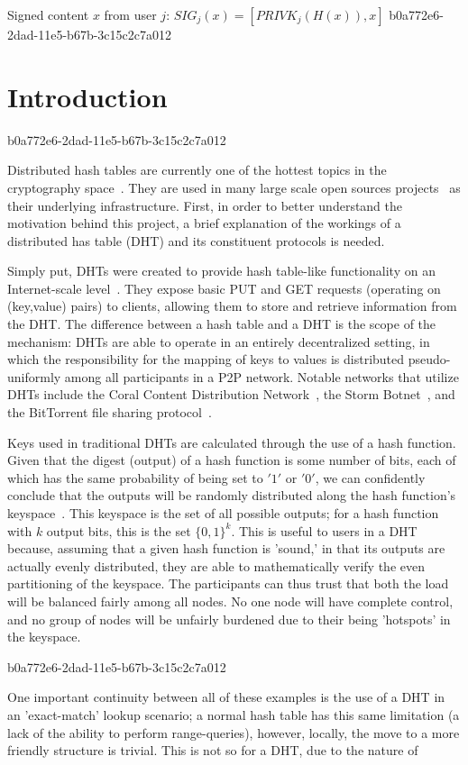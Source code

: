 \documentclass[12pt]{article}
\begin{document}
Signed content $x$ from user $j$: $SIG_j(x) = \left[ PRIVK_j( H(x) ), x \right]$
b0a772e6-2dad-11e5-b67b-3c15c2c7a012
\section{Introduction}
b0a772e6-2dad-11e5-b67b-3c15c2c7a012\par Distributed hash tables are currently one of the hottest topics in the cryptography space~\cite{Stoica:2001dj,Rowstron:2001ea,Ratnasamy:2001wn}. They are used in many large scale open sources projects~\cite{Freitas:2013tb,Xu:2010vs,Perfitt:2010fh} as their underlying infrastructure. First, in order to better understand the motivation behind this project, a brief explanation of the workings of a distributed has table (DHT) and its constituent protocols is needed.

\par Simply put, DHTs were created to provide hash table-like functionality on an Internet-scale level~\cite{Ratnasamy:2001wn}. They expose basic PUT and GET requests (operating on (key,value) pairs) to clients, allowing them to store and retrieve information from the DHT. The difference between a hash table and a DHT is the scope of the mechanism: DHTs are able to operate in an entirely decentralized setting, in which the responsibility for the mapping of keys to values is distributed pseudo-uniformly among all participants in a P2P network. Notable networks that utilize DHTs include the Coral Content Distribution Network~\cite{Freedman:2004vb}, the Storm Botnet~\cite{Holz:2008uk}, and the BitTorrent file sharing protocol~\cite{Cohen:y1_8mBnw}.

\par Keys used in traditional DHTs are calculated through the use of a hash function. Given that the digest (output) of a hash function is some number of bits, each of which has the same probability of being set to $'1'$ or $'0'$, we can confidently conclude that the outputs will be randomly distributed along the hash function's keyspace~. This keyspace is the set of all possible outputs; for a hash function with $k$ output bits, this is the set $\{0,1\}^k$. This is useful to users in a DHT because, assuming that a given hash function is 'sound,' in that its outputs are actually evenly distributed, they are able to mathematically verify the even partitioning of the keyspace. The participants can thus trust that both the load will be balanced fairly among all nodes. No one node will have complete control, and no group of nodes will be unfairly burdened due to their being 'hotspots' in the keyspace.~

b0a772e6-2dad-11e5-b67b-3c15c2c7a012\par One important continuity between all of these examples is the use of a DHT in an 'exact-match' lookup scenario; a normal hash table has this same limitation (a lack of the ability to perform range-queries), however, locally, the move to a more friendly structure is trivial. This is not so for a DHT, due to the nature of
\printbibliography
\end{document}
